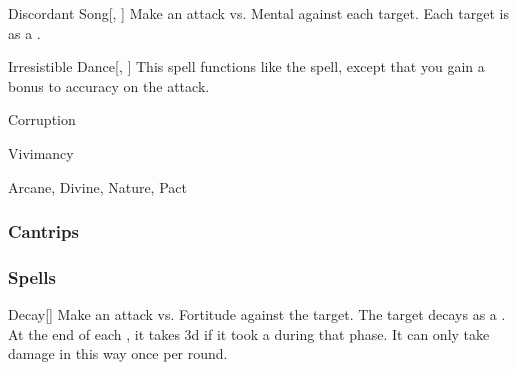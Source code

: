 \lowercase{\hypertarget{spell:Discordant Song}{}}\label{spell:Discordant Song}
\begin{freeability}[\nth{5}]{\hypertarget{spell:Discordant Song}{Discordant Song}}[, ]
Make an attack vs. Mental against each target.
\hit Each target is \disoriented as a .
\end{freeability}
\vspace{0.25em}



\lowercase{\hypertarget{spell:Irresistible Dance}{}}\label{spell:Irresistible Dance}
\begin{freeability}[\nth{6}]{\hypertarget{spell:Irresistible Dance}{Irresistible Dance}}[, ]
This spell functions like the  spell, except that you gain a  bonus to accuracy on the attack.
\end{freeability}
\vspace{0.25em}


\newpage
\begin{spellsection}{Corruption}

\begin{spellheader}
\end{spellheader}


 Vivimancy

 Arcane, Divine, Nature, Pact

\subsubsection{Cantrips}


\end{spellsection}


\subsubsection{Spells}


\lowercase{\hypertarget{spell:Decay}{}}\label{spell:Decay}
\begin{freeability}[\nth{1}]{\hypertarget{spell:Decay}{Decay}}[]
Make an attack vs. Fortitude against the target.
\hit The target decays as a .
At the end of each , it takes  \minus3d if it took a  during that phase.
It can only take damage in this way once per round.
\end{freeability}
\vspace{0.25em}



